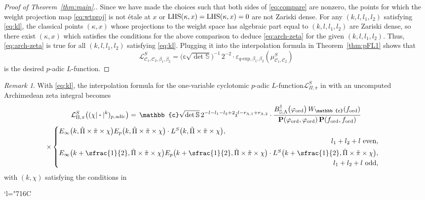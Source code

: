 \documentclass[JEP,XML,SOM,Unicode,published]{cedram}
\newcommand{\Changelback}{\mathcode`l="716C}
\newcommand{\Lfunction}{$L$\nobreakdash-func\-tion\xspace}
\theoremstyle{plain}
\theoremstyle{remark}
\newtheorem{rmk}[thm]{Remark}
\newcommand{\bS}{\mathbb{S}}
\newcommand{\bbc}{\mathbb{c}}
\newcommand{\cL}{\mathcal{L}}
\newcommand{\sC}{\mathscr{C}}
\newcommand{\bfP}{\mathbf{P}}
\newcommand{\ord}{\mathrm{ord}}
\newcommand{\bdot}{\boldsymbol{\cdot}}
\newcommand{\adic}{\text{-}\mathrm{adic}}
\newcommand{\qexp}{q\text{-}\mathrm{exp}}
\let\bes B
\let\whi W
\newcommand{\sLambda}{\scriptscriptstyle{\Lambda}}
\begin{document}
\begin{proof}[Proof of Theorem~\ref{thm:main}.]
Since we have made the choices such that both sides of \eqref{eq:compare} are nonzero, the points for which the weight projection map \eqref{eq:wtproj} is not \'{e}tale at $x$ or ${\rm LHS}(\kappa,x)={\rm LHS}(\kappa,x)=0$ are not Zariski dense. For any $(k,l,l_1,l_2)$ satisfying \eqref{eq:kl}, the classical points $(\kappa,x)$ whose projections to the weight space has algebraic part equal to $(k,l,l_1,l_2)$ are Zariski dense, so there exist $(\kappa,x)$ which satisfies the conditions for the above comparison to deduce \eqref{eq:arch-zeta} for the given $(k,l,l_1,l_2)$. Thus, \eqref{eq:arch-zeta} is true for all $(k,l,l_1,l_2)$ satisfying \eqref{eq:kl}. Plugging it into the interpolation formula in Theorem~\ref{thm:pFL1} shows that
\[
\cL^S_{\sC_1,\sC_2,\beta_1,\beta_2}=\bigl(\bbc\sqrt{\det\bS}\bigr)^{-1}\,2^{-2}\cdot \varepsilon_{\qexp,\beta_1,\beta_2}\left(\mu^S_{\sC_1,\sC_2}\right)
\]
is the desired $p$-adic \Lfunction.
\end{proof}

\begin{rmk}
With \eqref{eq:kl}, the interpolation formula for the one-variable cyclotomic $p$-adic \Lfunction $\cL^S_{\Pi,\pi}$ in \cite[Th.\,1.0.1]{pFL} with an uncomputed Archimedean zeta integral becomes\vspace*{-5pt}
\begin{multline*}
\cL^S_{\Pi,\pi}\bigl((\chi|\bdot|^k)_{p_\adic}\bigr)
= \,\bbc\sqrt{\det\bS}\, 2^{-l-l_1-l_2+2}i^{l-r_{\sLambda,1}+r_{\sLambda,2}}\cdot \frac{\bes^\dagger_{\bS,\Lambda}\bigl(\varphi_{\ord}\bigr)
\,\whi_\bbc(f_\ord)}{ \bfP(\varphi_\ord,\varphi_\ord)\,\bfP(f_\ord,f_\ord)} \\
\times
\begin{cases}
E_\infty\bigl(k,\tilde{\Pi}\times\tilde{\pi}\times\chi\bigr)
E_p\bigl(k,\tilde{\Pi}\times\tilde{\pi}\times\chi\bigr)
\cdot L^S\bigl(k,\tilde{\Pi}\times\tilde{\pi}\times\chi\bigr), \\
\hfill \text{$l_1+l_2+l$ even},\\[3pt]
E_\infty\bigl(k+\sfrac{1}{2},\tilde{\Pi}\times\tilde{\pi}\times\chi\bigr)
E_p\bigl(k+\sfrac{1}{2},\tilde{\Pi}\times\tilde{\pi}\times\chi\bigr)
\cdot L^S\bigl(k+\sfrac{1}{2},\tilde{\Pi}\times\tilde{\pi}\times\chi\bigr), \\
\hfill \text{$l_1+l_2+l$ odd},
\end{cases}
\end{multline*}
with $(k,\chi)$ satisfying the conditions in \loccit
\end{rmk}

\Changelback

\backmatter


\end{document}
